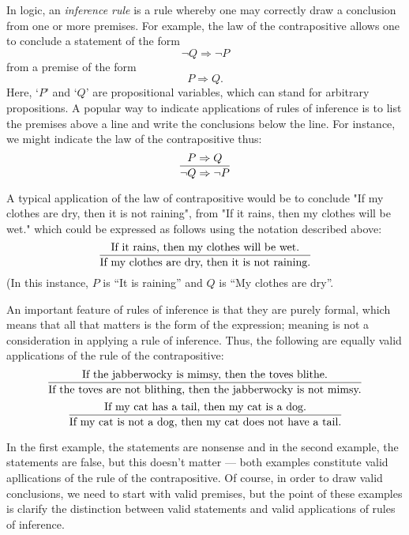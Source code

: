 \documentclass[12pt]{article}
\begin{document}
In logic, an \emph{inference rule} is a rule whereby one may correctly
draw a conclusion from one or more premises.  For example, the law of
the contrapositive allows one to conclude a statement of the form
\[ \neg Q \Rightarrow \neg P \]
from a premise of the form
\[ P \Rightarrow Q. \]
Here, `$P$' and `$Q$' are propositional variables, which can stand for
arbitrary propositions.  A popular way to indicate applications of rules
of inference is to list the premises above a line and write the
conclusions below the line.  For instance, we might indicate the law
of the contrapositive thus:
\[
{P \Rightarrow Q \over \neg Q \Rightarrow \neg P}
\]


A typical application of the law of
contrapositive would be to conclude "If my clothes are dry, then it is not
raining", from "If it rains, then my clothes will be wet." which could be
expressed as follows using the notation described above:
\[
{\hbox{If it rains, then my clothes will be wet.} \over
\hbox{If my clothes are dry, then it is not raining.}}
\]
(In this 
instance, $P$ is ``It is raining'' and $Q$ is ``My clothes are dry''.

An important feature of rules of inference is that they are purely formal, 
which means that all that matters is the form of the expression;
meaning is not a consideration in applying a rule of inference.
Thus, the following are equally valid applications of the rule of
the contrapositive:
\[
{\hbox{If the jabberwocky is mimsy, then the toves blithe.} \over
\hbox{If the toves are not blithing, then the jabberwocky is not mimsy.}}
\]
\medskip
\[
{\hbox{If my cat has a tail, then my cat is a dog.} \over
\hbox{If my cat is not a dog, then my cat does not have a tail.}}
\]

In the first example, the statements are nonsense and in the second
example, the statements are false, but this doesn't matter --- both
examples constitute valid apllications of the rule of the contrapositive.
Of course, in order to draw valid conclusions, we need to start with
valid premises, but the point of these examples is clarify the
distinction between valid statements and valid applications of
rules of inference.
\end{document}
